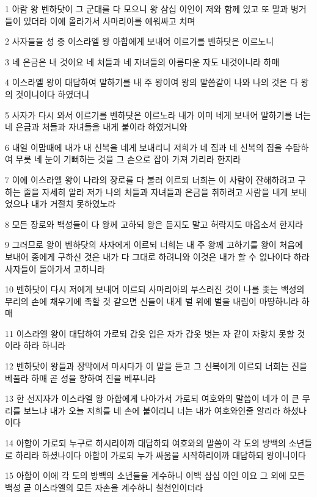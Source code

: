 \par 1 아람 왕 벤하닷이 그 군대를 다 모으니 왕 삼십 이인이 저와 함께 있고 또 말과 병거들이 있더라 이에 올라가서 사마리아를 에워싸고 치며
\par 2 사자들을 성 중 이스라엘 왕 아합에게 보내어 이르기를 벤하닷은 이르노니
\par 3 네 은금은 내 것이요 네 처들과 네 자녀들의 아름다운 자도 내것이니라 하매
\par 4 이스라엘 왕이 대답하여 말하기를 내 주 왕이여 왕의 말씀같이 나와 나의 것은 다 왕의 것이니이다 하였더니
\par 5 사자가 다시 와서 이르기를 벤하닷은 이르노라 내가 이미 네게 보내어 말하기를 너는 네 은금과 처들과 자녀들을 내게 붙이라 하였거니와
\par 6 내일 이맘때에 내가 내 신복을 네게 보내리니 저희가 네 집과 네 신복의 집을 수탐하여 무릇 네 눈이 기뻐하는 것을 그 손으로 잡아 가져 가리라 한지라
\par 7 이에 이스라엘 왕이 나라의 장로를 다 불러 이르되 너희는 이 사람이 잔해하려고 구하는 줄을 자세히 알라 저가 나의 처들과 자녀들과 은금을 취하려고 사람을 내게 보내었으나 내가 거절치 못하였노라
\par 8 모든 장로와 백성들이 다 왕께 고하되 왕은 듣지도 말고 허락지도 마옵소서 한지라
\par 9 그러므로 왕이 벤하닷의 사자에게 이르되 너희는 내 주 왕께 고하기를 왕이 처음에 보내어 종에게 구하신 것은 내가 다 그대로 하려니와 이것은 내가 할 수 없나이다 하라 사자들이 돌아가서 고하니라
\par 10 벤하닷이 다시 저에게 보내어 이르되 사마리아의 부스러진 것이 나를 좇는 백성의 무리의 손에 채우기에 족할 것 같으면 신들이 내게 벌 위에 벌을 내림이 마땅하니라 하매
\par 11 이스라엘 왕이 대답하여 가로되 갑옷 입은 자가 갑옷 벗는 자 같이 자랑치 못할 것이라 하라 하니라
\par 12 벤하닷이 왕들과 장막에서 마시다가 이 말을 듣고 그 신복에게 이르되 너희는 진을 베풀라 하매 곧 성을 향하여 진을 베푸니라
\par 13 한 선지자가 이스라엘 왕 아합에게 나아가서 가로되 여호와의 말씀이 네가 이 큰 무리를 보느냐 내가 오늘 저희를 네 손에 붙이리니 너는 내가 여호와인줄 알리라 하셨나이다
\par 14 아합이 가로되 누구로 하시리이까 대답하되 여호와의 말씀이 각 도의 방백의 소년들로 하리라 하셨나이다 아합이 가로되 누가 싸움을 시작하리이까 대답하되 왕이니이다
\par 15 아합이 이에 각 도의 방백의 소년들을 계수하니 이백 삼십 이인 이요 그 외에 모든 백성 곧 이스라엘의 모든 자손을 계수하니 칠천인이더라
